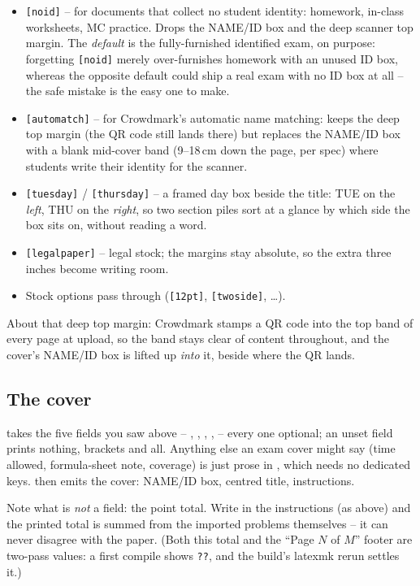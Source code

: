 \begin{itemize}
  \item \texttt{[noid]} -- for documents that collect no student identity:
    homework, in-class worksheets, MC practice. Drops the NAME/ID box and the
    deep scanner top margin. The \emph{default} is the fully-furnished
    identified exam, on purpose: forgetting \texttt{[noid]} merely
    over-furnishes homework with an unused ID box, whereas the opposite
    default could ship a real exam with no ID box at all -- the safe mistake
    is the easy one to make.
  \item \texttt{[automatch]} -- for Crowdmark's automatic name matching:
    keeps the deep top margin (the QR code still lands there) but replaces
    the NAME/ID box with a blank mid-cover band (9--18\,cm down the page, per
    spec) where students write their identity for the scanner.
  \item \texttt{[tuesday]} / \texttt{[thursday]} -- a framed day box beside
    the title: TUE on the \emph{left}, THU on the \emph{right}, so two
    section piles sort at a glance by which side the box sits on, without
    reading a word.
  \item \texttt{[legalpaper]} -- legal stock; the margins stay absolute, so
    the extra three inches become writing room.
  \item Stock  options pass through (\texttt{[12pt]},
    \texttt{[twoside]}, \dots).
\end{itemize}

About that deep top margin: Crowdmark stamps a QR code into the top band of
every page at upload, so the band stays clear of content throughout, and the
cover's NAME/ID box is lifted up \emph{into} it, beside where the QR lands.

\subsection{The cover}

 takes the five fields you saw above -- ,
, , ,  -- every one optional;
an unset field prints nothing, brackets and all. Anything else an exam cover
might say (time allowed, formula-sheet note, coverage) is just prose in
, which needs no dedicated keys.  then
emits the cover: NAME/ID box, centred title, instructions.

Note what is \emph{not} a field: the point total. Write
 in the instructions (as above) and the printed total is
summed from the imported problems themselves -- it can never disagree with
the paper. (Both this total and the ``Page $N$ of $M$'' footer are two-pass
values: a first compile shows \texttt{??}, and the build's latexmk rerun
settles it.)

